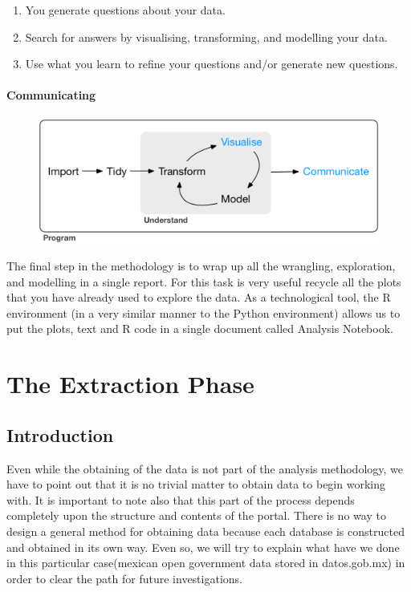\documentclass[]{book}
\providecommand{\tightlist}{%
  \setlength{\itemsep}{0pt}\setlength{\parskip}{0pt}}
\begin{document}
\begin{enumerate}
\def\labelenumi{\arabic{enumi}.}
\tightlist
\item
  You generate questions about your data.
\item
  Search for answers by visualising, transforming, and modelling your
  data.
\item
  Use what you learn to refine your questions and/or generate new
  questions.
\end{enumerate}

\subsubsection{Communicating}\label{communicating}

\begin{figure}
\centering
\includegraphics{diagrams/data-science-communicate.png}
\caption{}
\end{figure}

The final step in the methodology is to wrap up all the wrangling,
exploration, and modelling in a single report. For this task is very
useful recycle all the plots that you have already used to explore the
data. As a technological tool, the R environment (in a very similar
manner to the Python environment) allows us to put the plots, text and R
code in a single document called Analysis Notebook.

\chapter{The Extraction Phase}\label{the-extraction-phase}

\section{Introduction}\label{introduction-1}

Even while the obtaining of the data is not part of the analysis
methodology, we have to point out that it is no trivial matter to obtain
data to begin working with. It is important to note also that this part
of the process depends completely upon the structure and contents of the
portal. There is no way to design a general method for obtaining data
because each database is constructed and obtained in its own way. Even
so, we will try to explain what have we done in this particular
case(mexican open government data stored in datos.gob.mx) in order to
clear the path for future investigations.
\end{document}
